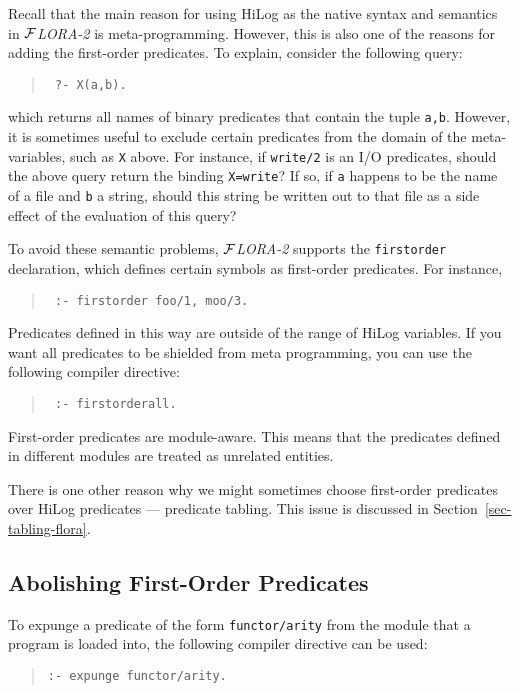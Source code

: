 \documentclass[11pt]{article}
\newcommand{\FLORA}{{\mbox{${\cal F}${\small\it LORA}\rm\emph{-2}}}\xspace}
\begin{document}
Recall that the main reason for using HiLog as the native syntax and
semantics in \FLORA is meta-programming. However, this is also one of the
reasons for adding the first-order predicates. To explain, consider the
following query:
\begin{quote}
 \tt
 ?- X(a,b).
\end{quote}
which returns all names of binary predicates that contain
the tuple {\tt a,b}. However, it is sometimes useful to exclude certain
predicates from the domain of the meta-variables, such as {\tt X} above.
For instance, if {\tt write/2}  is an I/O predicates, should the above
query return the binding {\tt X=write}? If so, if {\tt a} happens to be the
name of a file and {\tt b} a string, should this string be written out to
that file as a side effect of the evaluation of this query?

To avoid these semantic problems, \FLORA supports the {\tt firstorder}
declaration, which defines certain symbols as first-order predicates. For
instance,
\begin{quote}
 \tt
 :- firstorder foo/1, moo/3.
\end{quote}
Predicates defined in this way are outside of the range of HiLog variables.
If you want all predicates to be shielded from meta programming, you can use
the following compiler directive:
\begin{quote}
  \tt
  :- firstorderall.
\end{quote}

First-order predicates are module-aware. This means that the predicates defined
in different modules are treated as unrelated entities.

There is one other reason why we might sometimes choose first-order
predicates over HiLog predicates --- predicate tabling. This issue
is discussed in Section~\ref{sec-tabling-flora}.



\subsection{Abolishing First-Order Predicates}


%
To expunge a predicate of the form {\tt functor/arity} from the module that
a program is loaded into, the following compiler directive can be used:
\begin{quote}
\verb!:- expunge functor/arity.!
\end{quote}
\end{document}
